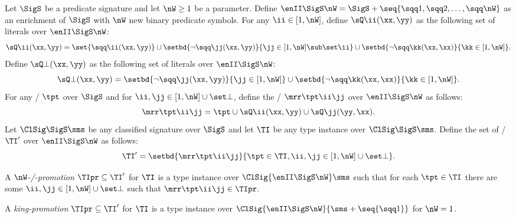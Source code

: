 \begin{definition}
Let $\SigS$ be a predicate signature and let $\nW\geq1$ be a parameter.
Define $\enII\SigS\nW = \SigS + \seq{\sqq1,\sqq2,\dots,\sqq\nW}$ as an
enrichment of $\SigS$ with $\nW$ new binary predicate symbols.
For any $\ii\in[1,\nW]$, define $\sQ\ii(\xx,\yy)$ as the following set of
literals over $\enII\SigS\nW$:
\[
\sQ\ii(\xx,\yy) = \set{\sqq\ii(\xx,\yy)} \cup
\setbd{\lnot\sqq\jj(\xx,\yy)}{\jj\in[1,\nW]\sub\set\ii} \cup
\setbd{\lnot\sqq\kk(\xx,\xx)}{\kk\in[1,\nW]}.
\]
Define $\sQ\bot(\xx,\yy)$ as the following set of literals over $\enII\SigS\nW$:
\[
\sQ\bot(\xx,\yy) = \setbd{\lnot\sqq\jj(\xx,\yy)}{\jj\in[1,\nW]} \cup
\setbd{\lnot\sqq\kk(\xx,\xx)}{\kk\in[1,\nW]}.
\]
For any \twotype/ $\tpt$ over $\SigS$ and for $\ii,\jj\in[1,\nW]\cup\set\bot$,
define the \twotype/ $\mrr\tpt\ii\jj$ over $\enII\SigS\nW$ as follows:
\[
\mrr\tpt\ii\jj = \tpt \cup \sQ\ii(\xx,\yy) \cup \sQ\jj(\yy,\xx).
\]
Let $\ClSig\SigS\sms$ be any classified signature over $\SigS$
and let $\TI$ be any type instance over $\ClSig\SigS\sms$.
Define the set of \twotypes/ $\TI'$ over $\enII\SigS\nW$ as follows:
\[
\TI' = \setbd{\mrr\tpt\ii\jj}{\tpt\in\TI,\ii,\jj\in[1,\nW]\cup\set\bot}.
\]

A \emph{$\nW$-\twotype/-promotion} $\TIpr\subseteq\TI'$ for $\TI$ is a type
instance over $\ClSig{\enII\SigS\nW}\sms$ such that for each $\tpt\in\TI$ there
are some $\ii,\jj\in[1,\nW]\cup\set\bot$ such that $\mrr\tpt\ii\jj\in\TIpr$.

A \emph{king-promotion} $\TIpr\subseteq\TI'$ for $\TI$ is a type instance over
$\ClSig{\enII\SigS\nW}{\sms+\seq{\sqq1}}$ for $\nW = 1$.
\end{definition}

